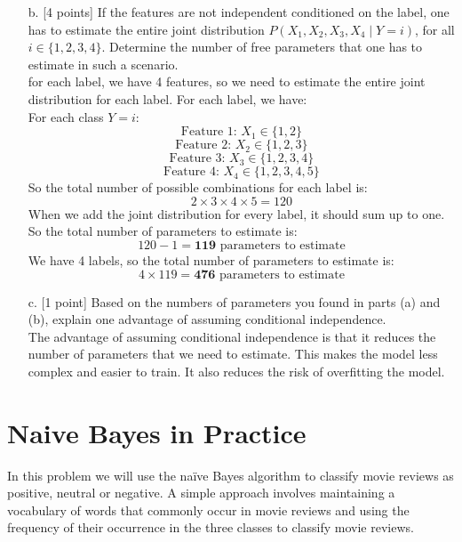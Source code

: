 \documentclass[a3paper,12pt]{extarticle} %
\begin{document}
\begin{enumerate}
    \item[b.] [4 points] If the features are not independent conditioned on the label, one has to estimate the entire joint distribution $P(X_1, X_2, X_3, X_4 \mid Y = i)$, for all $i \in \{1, 2, 3, 4\}$. Determine the number of free parameters that one has to estimate in such a scenario.
    \\ for each label, we have 4 features, so we need to estimate the entire joint distribution for each label. For each label, we have:
    \\ For each class \(Y = i\):
    \[
        \text{Feature 1: } X_1 \in \{1, 2\}
    \]
    \[
        \text{Feature 2: } X_2 \in \{1, 2, 3\}
    \]
    \[
        \text{Feature 3: } X_3 \in \{1, 2, 3, 4\}
    \]
    \[
        \text{Feature 4: } X_4 \in \{1, 2, 3, 4, 5\}
    \]
    So the total number of possible combinations for each label is:
    \[
        2 \times 3 \times 4 \times 5 = 120
    \]
    When we add the joint distribution for every label, it should sum up to one. So the total number of parameters to estimate is:
    \[
    120 - 1 = \textbf{119}\text{  parameters to estimate}
    \]
    We have 4 labels, so the total number of parameters to estimate is:
    \[
    4 \times 119 = \textbf{476}\text{  parameters to estimate}
    \]
    \item[c.] [1 point] Based on the numbers of parameters you found in parts (a) and (b), explain one advantage of assuming conditional independence.
    \\ The advantage of assuming conditional independence is that it reduces the number of parameters that we need to estimate. This makes the model less complex and easier to train. It also reduces the risk of overfitting the model.
\end{enumerate}
\newpage
\section{Naive Bayes in Practice}

In this problem we will use the na\"ive Bayes algorithm to classify movie reviews as positive, neutral or negative. A simple approach involves maintaining a vocabulary of words that commonly occur in movie reviews and using the frequency of their occurrence in the three classes to classify movie reviews.
\end{document}
